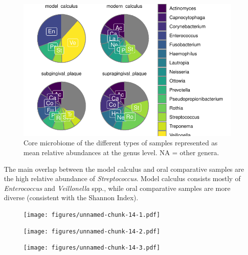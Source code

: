 \documentclass[
]{article}
\begin{document}
\begin{figure}

{\centering \includegraphics{figures/fig-genus-env-1.pdf}

}

\caption{\label{fig-genus-env}Core microbiome of the different types of
samples represented as mean relative abundances at the genus level. NA =
other genera.}

\end{figure}

The main overlap between the model calculus and oral comparative samples
are the high relative abundance of \emph{Streptococcus}. Model calculus
consists mostly of \emph{Enterococcus} and \emph{Veillonella} spp.,
while oral comparative samples are more diverse (consistent with the
Shannon Index).

\begin{figure}

{\centering \texttt{[image: figures/unnamed-chunk-14-1.pdf]}

}

\end{figure}

\begin{figure}

{\centering \texttt{[image: figures/unnamed-chunk-14-2.pdf]}

}

\end{figure}

\begin{figure}

{\centering \texttt{[image: figures/unnamed-chunk-14-3.pdf]}

}

\end{figure}
\end{document}
